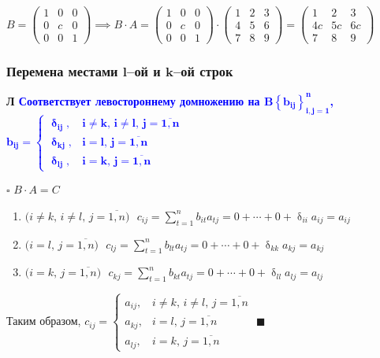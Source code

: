 \documentclass[12pt, a4paper]{report}
\newcommand{\sqbox}{%
	\collectbox{%
		\setlength{\fboxsep}{2pt}%
		\fbox{\BOXCONTENT}%
	}%
}
\newcommand{\lm}[1][]{\begin{flushleft}\textbf{\sqbox{Л} \textcolor{Blue}{#1}}\end{flushleft}}
\begin{document}
	\bigskip\(B=\begin{pmatrix}1&0&0\\0&c&0\\0&0&1\end{pmatrix}\implies B\cdot A = \begin{pmatrix}1&0&0\\0&c&0\\0&0&1\end{pmatrix}\cdot \begin{pmatrix}1&2&3\\4&5&6\\7&8&9\end{pmatrix}=\begin{pmatrix}1&2&3\\4c&5c&6c\\7&8&9\end{pmatrix}\)
	\subsubsection{Перемена местами \(\boldsymbol{l}\)--ой и \(\boldsymbol{k}\)--ой строк}
	\lm[Соответствует левостороннему домножению на \(\boldsymbol{B\left\{b_{ij}\right\}_{i,j=1}^{n}}\), \(\boldsymbol{b_{ij}=\begin{cases}\updelta_{ij},&i\neq k,\,i\neq l,\,j=\overline{1,n}\\\updelta_{kj},&i=l,\,j=\overline{1,n}\\\updelta_{lj},&i=k,\,j=\overline{1,n}\end{cases}}\)]
	
	\(\square\) \(B\cdot A = C\)
	
	\begin{enumerate}[{2.}1)]
		\item\(\displaystyle\big(i\neq k,\,i\neq l,\,j=\overline{1,n}\big)\text{ } c_{ij}=\sum_{t=1}^{n}b_{it}a_{tj}=0+\dotsb+0+\updelta_{ii}a_{ij}=a_{ij}\)
	
		\item\(\displaystyle\big(i=l,\,j=\overline{1,n}\big)\text{ }c_{lj}=\sum_{t=1}^{n}b_{lt}a_{tj}=0+\dotsb+0+\updelta_{kk}a_{kj}=a_{kj}\)
		
		\item\(\displaystyle\big(i=k,\,j=\overline{1,n}\big)\text{ }c_{kj}=\sum_{t=1}^{n}b_{kt}a_{tj}=0+\dotsb+0+\updelta_{ll}a_{lj}=a_{lj}\)
	\end{enumerate}

	Таким образом, \(c_{ij}=\begin{cases}a_{ij},&i\neq k,\,i\neq l,\,j=\overline{1,n}\\a_{kj},&i=l,\,j=\overline{1,n}\\a_{lj},&i=k,\,j=\overline{1,n}\end{cases}\) \(\blacksquare\)
	
\end{document}

